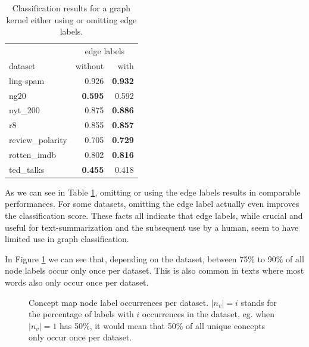 \begin{table}[htb!]
	\centering
\begin{tabular}{lrr}
	{} & \multicolumn{2}{c}{edge labels} \\
	dataset & without & with \\
	\midrule
		ling-spam       & 0.926 & \textbf{0.932} \\
		ng20            & \textbf{0.595} & 0.592 \\
		nyt\_200         & 0.875 & \textbf{0.886} \\
		r8              & 0.855 & \textbf{0.857} \\
		review\_polarity & 0.705 & \textbf{0.729} \\
		rotten\_imdb     & 0.802 & \textbf{0.816} \\
		ted\_talks       & \textbf{0.455} & 0.418 \\
	\bottomrule
\end{tabular}
\caption[Results: Graph Kernel with and without edge labels]{Classification results for a graph kernel either using or omitting edge labels.}\label{table:edge_label_classification}
\end{table}

As we can see in Table \ref{table:edge_label_classification}, omitting or using the edge labels results in comparable performances.
For some datasets, omitting the edge label actually even improves the classification score.
These facts all indicate that edge labels, while crucial and useful for text-summarization and the subsequent use by a human, seem to have limited use in graph classification.


In Figure \ref{fig:percentage_distribution_concept_occurrences} we can see that, depending on the dataset, between 75\% to 90\% of all node labels occur only once per dataset.
This is also common in texts where most words also only occur once per dataset.
 
\begin{figure}[htb!]
	\caption[Statistics: Distribution concept occurrence]{Concept map node label occurrences per dataset. $|n_v| = i$ stands for the percentage of labels with $i$ occurrences in the dataset, eg. when $|n_v| = 1$ has 50\%, it would mean that 50\% of all unique concepts only occur once per dataset.}\label{fig:percentage_distribution_concept_occurrences}
\end{figure}

